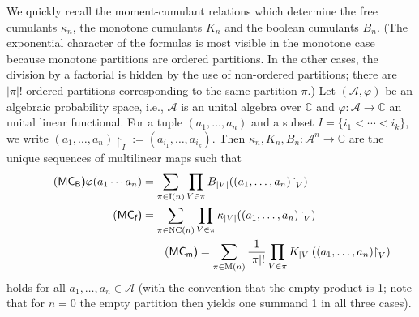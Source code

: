 \documentclass[pdftex]{sigma}
\renewcommand{\restriction}[2]{{#1\mathbin{\upharpoonright}_{#2}}}
\def\nc{\mathrm{NC}}
\def\ip{\mathrm{I}}
\def\monp{\mathrm{M}}
\def\CC{\mathbb{C}}
\numberwithin{equation}{section}
\begin{document}
We quickly recall the moment-cumulant relations which determine the free cumulants $\kappa_n$, the monotone cumulants $K_n$ and the boolean cumulants $B_n$. (The exponential character of the formulas is most visible in the monotone case because monotone partitions are ordered partitions. In the other cases, the division by a factorial is hidden by the use of non-ordered partitions; there are $|\pi|!$ ordered partitions corresponding to the same partition $\pi$.) Let $(\mathcal A,\varphi)$ be an algebraic probability space, i.e., $\mathcal A$ is an unital algebra over $\mathbb C$ and $\varphi\colon \mathcal A\to\CC$ an unital linear functional. For a tuple $(a_1,\dots, a_n)$ and a subset $I=\{i_1<\cdots <i_k\}$, we write $\restriction{(a_1,\dots,a_n)}{I}:=(a_{i_1},\dots,a_{i_k})$. Then $\kappa_n,K_n,B_n\colon \mathcal{A}^n\to\CC$ are the unique sequences of multilinear maps such that
\begin{align}
	\label{eqn:mcrB}
	\tag{\sf MC$_{\text{B}}$} \varphi(a_1\cdots a_n) & = \sum_{\pi \in \ip(n)}\prod_{V \in \pi} B_{|V|}(\restriction{(a_1,\dots,a_n)}{V}) \\
	\label{eqn:mcmrf}
	\tag{\sf MC$_{\text{f}}$}
	 & = \sum_{\pi \in \nc(n)}\prod_{V \in \pi} \kappa_{|V|}(\restriction{(a_1,\dots,a_n)}{V}) \\
	\label{eqn:mcrmo} & \tag{\sf MC$_{\text{m}}$} = \sum_{\pi \in \monp(n)}\frac{1}{|\pi|!}\prod_{V \in \pi} K_{|V|}(\restriction{(a_1,\dots,a_n)}{V})
\end{align}
holds for all $a_1,\dots, a_n\in \mathcal A$ (with the convention that the empty product is 1; note that for $n=0$ the empty partition then yields one summand 1 in all three cases).
\end{document}
